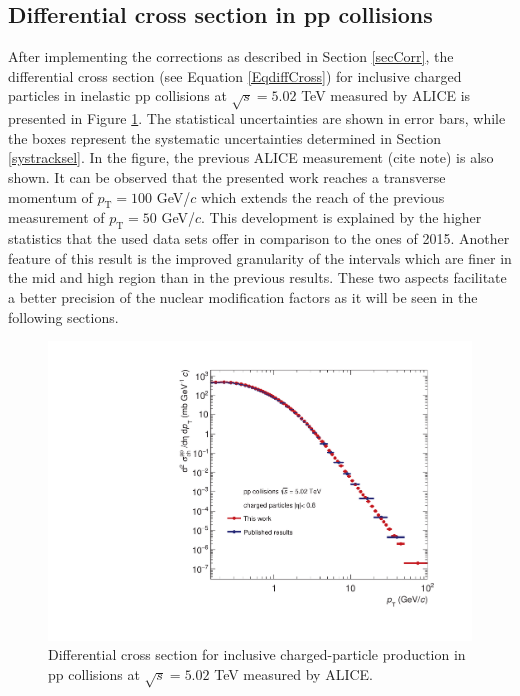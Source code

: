 \documentclass[12pt,a4paper]{report}
\begin{document}
\subsection{Differential cross section in pp collisions}
After implementing the corrections as described in Section \ref{secCorr}, the differential cross section (see Equation \ref{EqdiffCross}) for inclusive charged particles in inelastic pp collisions at $\sqrt{s}=5.02$ TeV measured by ALICE is presented in Figure \ref{diffCross}. The statistical uncertainties are shown in error bars, while the boxes represent the systematic uncertainties determined in Section \ref{systracksel}. In the figure, the previous ALICE measurement (cite note) is also shown. It can be observed that the presented work reaches a transverse momentum of $p_\text{T} = 100$ GeV/$c$ which extends the \pt reach of the previous measurement of $p_\text{T} = 50$ GeV/$c$. This development is explained by the higher statistics that the used data sets offer in comparison to the ones of 2015. Another feature of this result is the improved granularity of the \pt intervals which are finer in the mid and high \pt region than in the previous results. These two aspects facilitate a better precision of the nuclear modification factors as it will be seen in the following sections. 
\begin{figure}[tb!]
\centering
\includegraphics[width=12cm]{Plots/diffCrosspp.pdf}  
\caption{Differential cross section for inclusive charged-particle production in pp collisions at $\sqrt{s}=5.02$ TeV measured by ALICE.}
\label{diffCross}
\end{figure}
\end{document}
